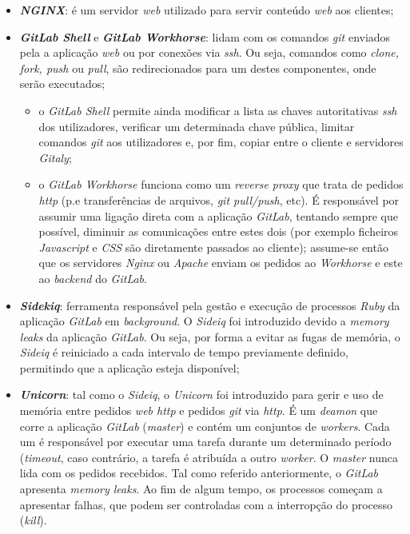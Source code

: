 \documentclass[12pt,a4paper]{article}
\begin{document}
\begin{itemize}
    \item \emph{\textbf{NGINX}}: é um servidor \emph{web} utilizado para servir conteúdo \emph{web} aos clientes;
    \item \emph{\textbf{GitLab Shell}} e \emph{\textbf{GitLab Workhorse}}: lidam com os comandos \emph{git} enviados pela a aplicação \emph{web} ou por conexões via \emph{ssh}. Ou seja, comandos como \emph{clone, fork, push} ou \emph{pull}, são redirecionados para um destes componentes, onde serão executados;
    \begin{itemize}
        \item o \emph{GitLab Shell} permite ainda modificar a lista as chaves autoritativas \emph{ssh} dos utilizadores, verificar um determinada chave pública, limitar comandos \emph{git} aos utilizadores e, por fim, copiar entre o cliente e servidores \emph{Gitaly};
        \item o \emph{GitLab Workhorse} funciona como um \emph{reverse proxy} que trata de pedidos \emph{http} (p.e transferências de arquivos, \emph{git pull/push}, etc). É responsável por assumir uma ligação direta com a aplicação \emph{GitLab}, tentando sempre que possível, diminuir as comunicações entre estes dois (por exemplo ficheiros \emph{Javascript} e \emph{CSS} são diretamente passados ao cliente); assume-se então que os servidores \emph{Nginx} ou \emph{Apache} enviam os pedidos ao \emph{Workhorse} e este ao \emph{backend} do \emph{GitLab}.
    \end{itemize}
    \item \emph{\textbf{Sidekiq}}: ferramenta responsável pela gestão e execução de processos \emph{Ruby} da aplicação \emph{GitLab} em \emph{background}. O \emph{Sideiq} foi introduzido devido a \emph{memory leaks} da aplicação \emph{GitLab}. Ou seja, por forma a evitar as fugas de memória, o \emph{Sideiq} é reiniciado a cada intervalo de tempo previamente definido, permitindo que a aplicação esteja disponível;
    \item \emph{\textbf{Unicorn}}: tal como o \emph{Sideiq}, o \emph{Unicorn} foi introduzido para gerir e uso de memória entre pedidos \emph{web http} e pedidos \emph{git} via \emph{http}. É um \emph{deamon} que corre a aplicação \emph{GitLab} (\emph{master}) e contém um conjuntos de \emph{workers}. Cada um é responsável por executar uma tarefa durante um determinado período (\emph{timeout}, caso contrário, a tarefa é atribuída a outro \emph{worker}. O \emph{master} nunca lida com os pedidos recebidos. Tal como referido anteriormente, o \emph{GitLab} apresenta \emph{memory leaks}. Ao fim de algum tempo, os processos começam a apresentar falhas, que podem ser controladas com a interropção do processo (\emph{kill}).
\end{itemize}
\end{document}
